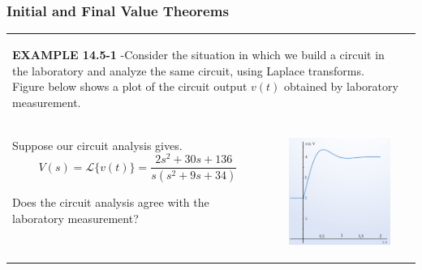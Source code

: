 \documentclass[aspectratio=169]{beamer}
\begin{document}
\begin{frame}[fragile]
	\frametitle{Initial and Final Value Theorems}
\begin{tabular}{ll}
	\begin{columns}
		\begin{column}{1\textwidth}  %
\small		\textbf{EXAMPLE 14.5-1} -Consider the situation in which we build a circuit in the laboratory and analyze the same 
		circuit, using Laplace
transforms. Figure below shows a plot of the circuit output $v(t)$ obtained by laboratory measurement. 


		\end{column}
		
		
	\end{columns}\\
	
		\begin{columns}
		\begin{column}{.5\textwidth}  %
Suppose our
circuit analysis gives.
$$V(s)=\mathscr{L}\{v(t)\}=\dfrac{2s^2+30s+136}{s(s^2+9s+34)}$$

Does the circuit analysis agree with the laboratory measurement?

		\end{column}
		\begin{column}{.5\textwidth}  %

		\begin{center}
    			\includegraphics[width=5cm,height=3.5cm]{figura11.png}	
		\end{center}	
		\end{column}
		
	\end{columns}
	
	
\end{tabular}
\end{frame}



\end{document}
